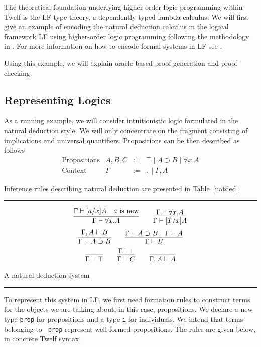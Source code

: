 \documentclass{acmconf}
\newcommand{\figfoot}{\vspace{1ex}\hrule}
\newcommand{\fighead}{\hrule\vspace{1.5ex}}
\newcommand{\orl}{\vee}
\newcommand{\andl}{\wedge}
\newcommand{\impl}{\supset}
\newcommand{\ldot}{.\,}
\begin{document}
The theoretical foundation underlying higher-order logic programming
within Twelf is the LF type theory, a dependently typed lambda
calculus. We will first give an example of encoding the natural
deduction calculus in the logical framework LF using higher-order
logic programming following the methodology in \cite{harper+:lf}. For
more information on how to encode formal systems in LF see
\cite{Pfenning97}. 

Using this example, we will explain oracle-based proof generation and
proof-checking. 

\subsection{Representing Logics}
As a running example, we will consider intuitionistic logic formulated
in the natural deduction style. We will only concentrate on the fragment
consisting of implications and universal quantifiers. Propositions can
be then described as follows
\[
\begin{array}{llll}
\mbox{Propositions} & A,B, C & := & \top \mid A \impl B \mid \forall x.A \\
\mbox{Context} & \Gamma & := & \ldot \mid \Gamma,  A
\end{array}
\]

Inference rules describing natural deduction are presented in Table~\ref{natded}.

\begin{table}[h]
\fighead
\[
\infer{\Gamma\vdash \forall x. A}
{\Gamma\vdash [a/x]A & a \mbox{ is new}}
\qquad
\infer{\Gamma\vdash [T/x]A}
{\Gamma\vdash \forall x.A}
\]
\[
\infer{\Gamma\vdash A\impl B}
{\Gamma,A\vdash B}
\qquad
\infer{\Gamma\vdash B}
{\Gamma\vdash A\impl B
\quad
\Gamma\vdash A}
\]
\[
\infer{\Gamma\vdash\top}
{}
\qquad
\infer{\Gamma\vdash C}
{\Gamma\vdash\perp}
\qquad
\infer{\Gamma, A \vdash A}
{}
\]
\caption{\label{natded}A natural deduction system}
\figfoot
\end{table}

To represent this system in LF, we first need formation rules to
construct terms for the objects we are talking about, in this case,
propositions. We declare a new type {\tt prop} for propositions and a
type {\tt i} for individuals. We intend that terms belonging to {\tt
  prop} represent well-formed propositions. The rules are given below,
in concrete Twelf syntax. 
\end{document}
